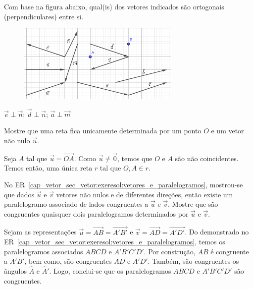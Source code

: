 \begin{exer}
  Com base na figura abaixo, qual(is) dos vetores indicados são ortogonais (perpendiculares) entre si.
  \begin{figure}[H]
    \centering
    \includegraphics[width=0.7\textwidth]{./cap_vetor/dados/fig_exer_definicao_01/fig_exer_definicao_01}
  \end{figure}
\end{exer}
\begin{resp}
  $\vec{e}\perp\vec{n}$; $\vec{d}\perp\vec{n}$; $\vec{a}\perp\vec{m}$
\end{resp}

\begin{exer}
  Mostre que uma reta fica unicamente determinada por um ponto $O$ e um vetor não nulo $\vec{u}$.
\end{exer}
\begin{resp}
  Seja $A$ tal que $\vec{u} = \overrightarrow{OA}$. Como $\vec{u}\neq\vec{0}$, temos que $O$ e $A$ são não coincidentes. Temos então, uma única reta $r$ tal que $O,A\in r$.
\end{resp}

\begin{exer}\label{cap_vetor_sec_vetor:exer:vetores_e_paralelogramos}
  No ER~\ref{cap_vetor_sec_vetor:exeresol:vetores_e_paralelogramos}, mostrou-se que dados $\vec{u}$ e $\vec{v}$ vetores não nulos e de diferentes direções, então existe um paralelogramo associado de lados congruentes a $\vec{u}$ e $\vec{v}$. Mostre que são congruentes quaisquer dois paralelogramos determinados por $\vec{u}$ e $\vec{v}$.
\end{exer}
\begin{resp}
  Sejam as representações $\vec{u}=\overrightarrow{AB}=\overrightarrow{A'B'}$ e $\vec{v}=\overrightarrow{AD}=\overrightarrow{A'D'}$. Do demonstrado no ER~\ref{cap_vetor_sec_vetor:exeresol:vetores_e_paralelogramos}, temos os paralelogramos associados $ABCD$ e $A'B'C'D'$. Por construção, $AB$ é congruente a $A'B'$, bem como, são congruentes $AD$ e $A'D'$. Também, são congruentes os ângulos $\hat{A}$ e $\hat{A}'$. Logo, conclui-se que os paralelogramos $ABCD$ e $A'B'C'D'$ são congruentes.
\end{resp}

